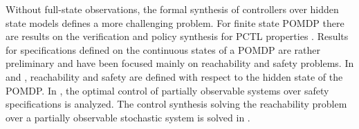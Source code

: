 \documentclass{ifacconf}
\newcommand{\red}[1]{{\color{red} #1}}
\renewcommand{\axx}[1]{{\color{orange} Ali:#1}}
\begin{document}
 
Without full-state observations, the formal synthesis of controllers over hidden state models
defines a more challenging problem.
 For finite state POMDP there are results on the verification and policy synthesis  for PCTL properties \citep{Norman2017, Chatterjee2014}.
%
Results for specifications defined on the continuous states of a POMDP are rather preliminary and have been focused mainly on reachability and safety problems. 
In  \citep{ding2013optimal} and \citep{LESSER20141989}, reachability and safety  are defined with respect to the hidden state of the POMDP.
%
In \citep{ding2013optimal}, the optimal control of partially observable systems over safety specifications is analyzed.  The control synthesis solving the reachability problem over a  partially observable stochastic system is solved
in \citep{LESSER20141989}. %

 
\end{document}
